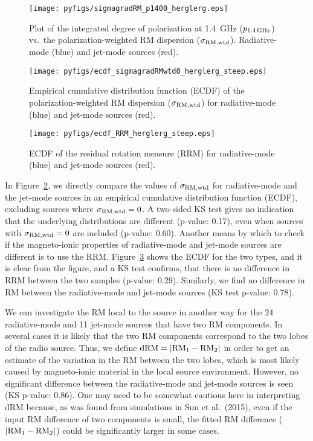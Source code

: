 \documentclass{mnras}
\newcommand*\sigmaRMwtd{\sigma_{\rm RM, wtd}}
\begin{document}
\begin{figure} 
\centering
    \texttt{[image: pyfigs/sigmagradRM\_p1400\_herglerg.eps]} 
    \caption{ {\small Plot of the integrated degree of polarization at 1.4~GHz ($p_{\rm 1.4\,GHz}$) vs.~the polarization-weighted 
    RM dispersion ($\sigmaRMwtd$). Radiative-mode (blue) and jet-mode sources (red). } }
    \label{sigmaRMp1400herglerg}
\end{figure} 

\begin{figure} 
\centering
    \texttt{[image: pyfigs/ecdf\_sigmagradRMwtd0\_herglerg\_steep.eps]} 
    \caption{ {\small Empirical cumulative distribution function (ECDF) of the polarization-weighted RM dispersion ($\sigmaRMwtd$) for 
    radiative-mode (blue) and jet-mode sources (red). } }
    \label{ecdfsigmaRM}
\end{figure} 

\begin{figure} 
\centering
    \texttt{[image: pyfigs/ecdf\_RRM\_herglerg\_steep.eps]} 
    \caption{ {\small ECDF of the residual rotation measure (RRM) for radiative-mode (blue) and jet-mode sources (red). } }
    \label{ecdfRRM}
\end{figure} 


In Figure~\ref{ecdfsigmaRM}, we directly compare the values of $\sigmaRMwtd$ for radiative-mode and the jet-mode sources in an empirical cumulative distribution function (ECDF), excluding sources where $\sigmaRMwtd=0$. 
A two-sided KS test gives no indication that the underlying distributions are different (p-value: 0.17), even when sources with $\sigmaRMwtd=0$ are included (p-value: 0.60).
Another means by which to check if the magneto-ionic properties of radiative-mode and jet-mode sources are different is to use the RRM. Figure~\ref{ecdfRRM} shows the ECDF for the two types, and it is clear from the figure, and a KS test confirms, that there is no difference in RRM between the two samples (p-value: 0.29). Similarly, we find no difference in RM between the radiative-mode and jet-mode sources (KS test p-value: 0.78). 

We can investigate the RM local to the source in another way for the 24 radiative-mode and 11 jet-mode sources that have two RM components. In several cases it is likely that the two RM components correspond to the two lobes of the radio source. Thus, we define ${\rm dRM}=| {\rm RM}_1 - {\rm RM}_2 |$ in order to get an estimate of the variation in the RM between the two lobes, which is most likely caused by magneto-ionic material in the local source environment. However, no significant difference between the radiative-mode and jet-mode sources is seen (KS p-value: 0.86). 
One may need to be somewhat cautious here in interpreting dRM because, as was found from simulations in Sun et al.~(2015), even if the input RM difference of two components is small, the fitted RM difference ($| {\rm RM}_1 - {\rm RM}_2 |$) could be significantly larger in some cases. 
\end{document}
